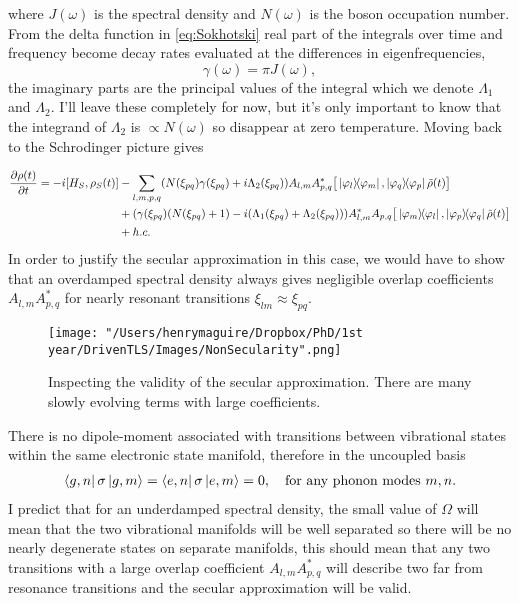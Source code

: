 \documentclass[]{article}
\begin{document}
where $J(\omega)$ is the spectral density and $N(\omega)$ is the boson occupation number. From the delta function in \ref{eq:Sokhotski} real part of the integrals over time and frequency become decay rates evaluated at the differences in eigenfrequencies,
\begin{equation}
\gamma(\omega)=\pi J(\omega),
\end{equation}
the imaginary parts are the principal values of the integral which we denote $\Lambda_1$ and $\Lambda_2$. I'll leave these completely for now, but it's only important to know that the integrand of $\Lambda_2$ is $ \propto N(\omega)$ so disappear at zero temperature.
Moving back to the Schrodinger picture gives

\begin{align}
	\label{eq:VibronicNonSecular1}
	\begin{split}
		\pdv{\rho(t)}{t} = -i[H_S, \rho_S(t)] &- \sum_{l,m,p,q}  (N(\xi_{pq})\gamma(\xi_{pq})+i\Lambda_2(\xi_{pq})) A_{l,m}A_{p,q}^{*}\big[\dyad{\varphi_l}{\varphi_m}, \dyad{\varphi_q}{\varphi_p}\tilde{\rho}(t)\big] \\
		&+ (\gamma(\xi_{pq})(N(\xi_{pq})+1)-i(\Lambda_1(\xi_{pq})+\Lambda_2(\xi_{pq})))  A_{l,m}^{*}A_{p,q}\big[\dyad{\varphi_m}{\varphi_l}, \dyad{\varphi_p}{\varphi_q}\tilde{\rho}(t)\big]\\ &+ h.c.
	\end{split}
\end{align}
In order to justify the secular approximation in this case, we would have to show that an overdamped spectral density always gives negligible overlap coefficients $A_{l,m}A_{p,q}^{*}$ for nearly resonant transitions $\xi_{lm}\approx \xi_{pq}$.
\begin{figure}
	\texttt{[image: "/Users/henrymaguire/Dropbox/PhD/1st year/DrivenTLS/Images/NonSecularity".png]}
	\caption{Inspecting the validity of the secular approximation. There are many slowly evolving terms with large coefficients.}
	\label{fig:}
\end{figure}
There is no dipole-moment associated with transitions between vibrational states within the same electronic state manifold, therefore in the uncoupled basis
\begin{align}
	\begin{split}
		\bra{g,n}\sigma\ket{g,m} = \bra{e,n}\sigma\ket{e,m} = 0, \quad \textnormal{for any phonon modes } m,n.
	\end{split}
\end{align}
I predict that for an underdamped spectral density, the small value of $\Omega$ will mean that the two vibrational manifolds will be well separated so there will be no nearly degenerate states on separate manifolds, this should mean that any two transitions with a large overlap coefficient $A_{l,m}A_{p,q}^{*}$ will describe two far from resonance transitions and the secular approximation will be valid.
\end{document}
